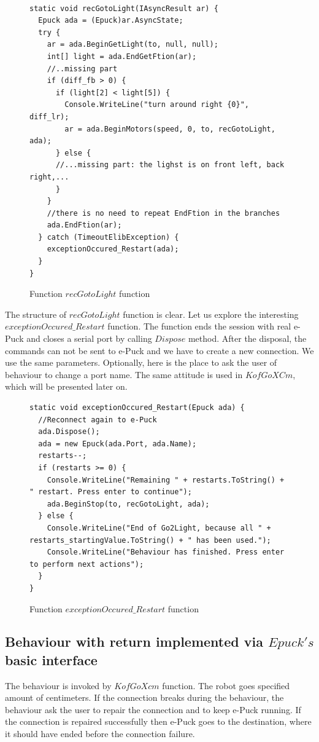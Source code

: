 \begin{figure}[!hbp]
\begin{lstlisting}
  
static void recGotoLight(IAsyncResult ar) {
  Epuck ada = (Epuck)ar.AsyncState;
  try {
    ar = ada.BeginGetLight(to, null, null);
    int[] light = ada.EndGetFtion(ar);
    //..missing part
    if (diff_fb > 0) {
      if (light[2] < light[5]) {
        Console.WriteLine("turn around right {0}", diff_lr);
        ar = ada.BeginMotors(speed, 0, to, recGotoLight, ada);
      } else {
      //...missing part: the lighst is on front left, back right,...
      }
    }
    //there is no need to repeat EndFtion in the branches
    ada.EndFtion(ar);
  } catch (TimeoutElibException) {
    exceptionOccured_Restart(ada);
  }
}
\end{lstlisting}
\caption{Function $recGotoLight$ function} \label{go2light}
\end{figure}
  The structure of $recGotoLight$ function is clear. Let us explore the interesting $exceptionOccured\_Restart$ function.
  The function ends the session with real e-Puck and closes a serial port by calling $Dispose$ method.
  After the disposal, the commands can not be sent to e-Puck and we have to create a new connection. We use the same parameters.
  Optionally, here is the place to ask the user of behaviour to change a port name.
  The same attitude is used in $KofGoXCm$, which will be presented later on.
\begin{figure}[!hbp]
\begin{lstlisting}
static void exceptionOccured_Restart(Epuck ada) {
  //Reconnect again to e-Puck
  ada.Dispose();
  ada = new Epuck(ada.Port, ada.Name);
  restarts--;
  if (restarts >= 0) {
    Console.WriteLine("Remaining " + restarts.ToString() + " restart. Press enter to continue");
    ada.BeginStop(to, recGotoLight, ada);
  } else {
    Console.WriteLine("End of Go2Light, because all " + restarts_startingValue.ToString() + " has been used.");
    Console.WriteLine("Behaviour has finished. Press enter to perform next actions");
  }
}
\end{lstlisting}
\caption{Function $exceptionOccured\_Restart$ function} \label{restart}
\end{figure}

\subsection{Behaviour with return implemented via $Epuck's$ basic interface}\label{sec:kofgoxcm}
  The behaviour is invoked by $KofGoXcm$ function. 
  The robot goes specified amount of centimeters. 
  If the connection breaks during the behaviour, 
  the behaviour ask the user to repair the connection and to keep e-Puck running. 
  If the connection is repaired successfully then e-Puck goes to the destination, 
  where it should have ended before the connection failure.


